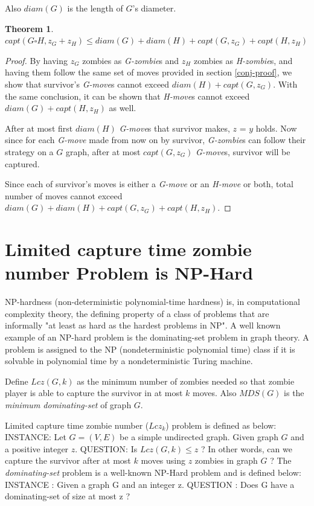\documentclass[1p]{elsarticle}
\newtheorem{theorem}{Theorem}
\begin{document}
	Also $diam(G)$ is the length of $G$'s diameter.
	\begin{theorem}
		\label{T5}
		$capt( G \square H, z_G + z_H ) \leq diam(G) + diam(H) + capt(G, z_G) + capt(H, z_H)$
	\end{theorem}
	\begin{proof}
		By having $z_G$ zombies as {\it G-zombie}s and $z_H$ zombies as {\it H-zombie}s, and having them follow the same
		set of moves provided in section \ref{conj-proof}, we show that survivor's {\it G-move}s cannot exceed $diam(H)
		+ capt(G, z_G)$. With the same conclusion, it can be shown that {\it H-move}s cannot exceed $diam(G) + capt(H, z_H)$
		as well.

		After at most first $diam(H)$ {\it G-move}s that survivor makes, $z$ = $y$ holds. Now since for each {\it
		G-move} made from now on by survivor, {\it G-zombie}s can follow their strategy on a $G$ graph, after at most
		$capt(G,z_G)$ {\it G-move}s, survivor will be captured. 
		
		Since each of survivor's moves is either a {\it G-move} or an {\it H-move} or both, total number of moves cannot
		exceed $diam(G) + diam(H) + capt(G, z_G) + capt(H, z_H)$.
	\end{proof}
\section{Limited capture time zombie number Problem is NP-Hard}\label{np-capturetime}

	NP-hardness (non-deterministic polynomial-time hardness) is, in computational complexity theory, the defining
	property of a class of problems that are informally "at least as hard as the hardest problems in NP". A well known
	example of an NP-hard problem is the dominating-set problem in graph theory. A problem is assigned to the NP
	(nondeterministic polynomial time) class if it is solvable in polynomial time by a nondeterministic Turing machine.


	Define $Lcz(G,k)$ as the minimum number of zombies needed so that zombie player is able to capture the survivor in
	at most $k$ moves. Also $MDS(G)$ is the {\it minimum dominating-set} of graph $G$.
	
	Limited capture time zombie number ($Lcz_k$) problem is defined as below:
	{\newline}
	INSTANCE: Let $G = (V,E)$ be a simple undirected graph. Given graph $G$ and a positive integer $z$.
	{\newline}
	QUESTION: Is $Lcz(G,k) \leq z$ ? In other words, can we capture the survivor after at most $k$ moves using $z$ zombies in graph $G$ ?
	{\newline}
	{\newline}
	The {\it dominating-set} problem is a well-known NP-Hard problem and is defined below:
	{\newline}
	INSTANCE : Given a graph G and an integer z.
	{\newline}
	QUESTION : Does G have a dominating-set of size at most z ?
\end{document}
